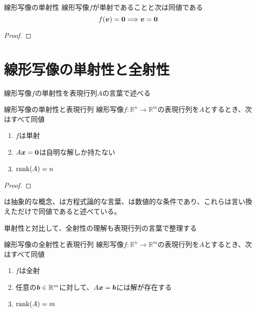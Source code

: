 \documentclass[../../../topic_linear-algebra]{subfiles}
\begin{document}
\sectionline

\begin{theorem}{線形写像の単射性}
  線形写像$f$が単射であることと次は同値である
  \begin{equation*}
    f(\vb*{v}) = \vb*{0} \Longrightarrow \vb*{v} = \vb*{0}
  \end{equation*}
\end{theorem}

\begin{proof}
\end{proof}

\sectionline
\section{線形写像の単射性と全射性}

線形写像$f$の単射性を表現行列$A$の言葉で述べる

\begin{theorem}{線形写像の単射性と表現行列}
  線形写像$f\colon \mathbb{R}^n \to \mathbb{R}^m$の表現行列を$A$とするとき、次はすべて同値
  \begin{enumerate}[label=\romanlabel]
    \item $f$は単射
    \item $A\vb*{x} = \vb*{0}$は自明な解しか持たない
    \item $\rank(A) = n$
  \end{enumerate}
\end{theorem}

\begin{proof}
\end{proof}

は抽象的な概念、は方程式論的な言葉、は数値的な条件であり、これらは言い換えただけで同値であると述べている。

\sectionline

単射性と対比して、全射性の理解も表現行列の言葉で整理する

\begin{theorem}{線形写像の全射性と表現行列}
  線形写像$f\colon \mathbb{R}^n \to \mathbb{R}^m$の表現行列を$A$とするとき、次はすべて同値
  \begin{enumerate}[label=\romanlabel]
    \item $f$は全射
    \item 任意の$\vb*{b} \in \mathbb{R}^m$に対して、$A\vb*{x} = \vb*{b}$には解が存在する
    \item $\rank(A) = m$
  \end{enumerate}
\end{theorem}
\end{document}
